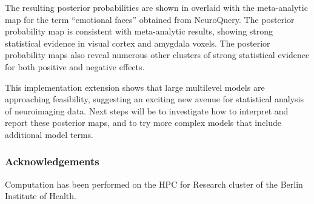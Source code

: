 \documentclass[../main.tex]{subfiles}
\begin{document}
The resulting posterior probabilities are shown in  overlaid with the meta-analytic map for the term ``emotional faces'' obtained from NeuroQuery\supercite{dockes_neuroquery_2020}. The posterior probability map is consistent with meta-analytic results, showing strong statistical evidence in visual cortex and amygdala voxels. The posterior probability maps also reveal numerous other clusters of strong statistical evidence for both positive and negative effects. 

This implementation extension shows that large multilevel models are approaching feasibility, suggesting an exciting new avenue for statistical analysis of neuroimaging data. Next steps will be to investigate how to interpret and report these posterior maps, and to try more complex models that include additional model terms.

\subsubsection*{Acknowledgements}

Computation has been performed on the HPC for Research cluster of the Berlin Institute of Health.
\end{document}
